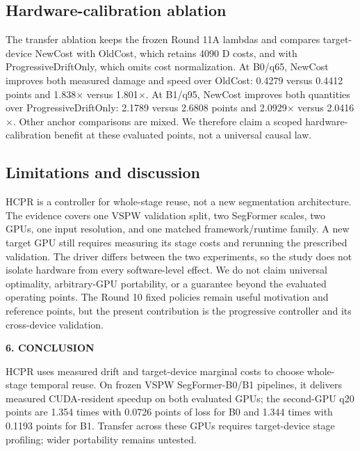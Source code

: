 \documentclass{article}
\begin{document}
\subsection{Hardware-calibration ablation}
The transfer ablation keeps the frozen Round 11A lambdas and compares target-device NewCost with OldCost, which retains 4090 D costs, and with ProgressiveDriftOnly, which omits cost normalization. At B0/q65, NewCost improves both measured damage and speed over OldCost: 0.4279 versus 0.4412 points and 1.838$\times$ versus 1.801$\times$. At B1/q95, NewCost improves both quantities over ProgressiveDriftOnly: 2.1789 versus 2.6808 points and 2.0929$\times$ versus 2.0416$\times$. Other anchor comparisons are mixed. We therefore claim a scoped hardware-calibration benefit at these evaluated points, not a universal causal law.

\subsection{Limitations and discussion}
HCPR is a controller for whole-stage reuse, not a new segmentation architecture. The evidence covers one VSPW validation split, two SegFormer scales, two GPUs, one input resolution, and one matched framework/runtime family. A new target GPU still requires measuring its stage costs and rerunning the prescribed validation. The driver differs between the two experiments, so the study does not isolate hardware from every software-level effect. We do not claim universal optimality, arbitrary-GPU portability, or a guarantee beyond the evaluated operating points. The Round 10 fixed policies remain useful motivation and reference points, but the present contribution is the progressive controller and its cross-device validation.

\noindent\begin{minipage}{0.96\columnwidth}
\begin{center}
{\bf 6. CONCLUSION}
\end{center}
HCPR uses measured drift and target-device marginal costs to choose whole-stage temporal reuse. On frozen VSPW SegFormer-B0/B1 pipelines, it delivers measured CUDA-resident speedup on both evaluated GPUs; the second-GPU q20 points are 1.354 times with 0.0726 points of loss for B0 and 1.344 times with 0.1193 points for B1. Transfer across these GPUs requires target-device stage profiling; wider portability remains untested.
\end{minipage}



\end{document}
